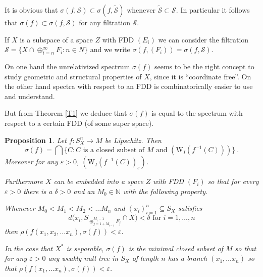 \documentclass[11pt,leqno]{amsart}
\newtheorem{prop}[thm]{Proposition}
\theoremstyle{definition}
\newcommand{\vp}{\varepsilon}
\newcommand{\cS}{\mathcal{S}}
\newcommand{\N}{\mathbb{N}}
\begin{document}
It is obvious that $\sigma(f,\cS)\subset \sigma(f,\tilde{\cS})$ 
whenever $\tilde{\cS}\subset\cS$. In particular
it follows that $\sigma(f)\subset\sigma(f,\cS)$ for any filtration $\cS$.
  
If $X$ is a subspace of a space $Z$ with  FDD $(E_i)$ 
we can consider the filtration
$\cS=\{X\cap\oplus_{i=n}^\infty F_i:n\in N\}$ and 
we write $\sigma(f,(F_i))=\sigma(f,\cS)$.
  
On one hand the unrelativized spectrum $\sigma(f)$ seems to be 
the right concept to study
geometric  and structural properties of $X$, since it is ``coordinate free''. 
On the other hand spectra with respect to an FDD is 
combinatorically easier to use and understand.  

But from Theorem \ref{T1} we deduce that $\sigma(f)$ is equal to the spectrum 
with respect to a  certain FDD (of some super space).
 
\begin{prop}\label{P3}
Let $f: S^n_X\to M$ be Lipschitz. 
Then 
\begin{equation}\label{E41}
\sigma(f)=\bigcap\{ C: C\text{ is a closed subset 
of $M$ and } (\text{W}_{I}(f^{-1}(C))) \}\ .
\end{equation}
Moreover for any $\vp>0$, $(\text{W}_{I}(f^{-1}(C))_\vp)$. 
 
Furthermore $X$ can be embedded into a space $Z$ with FDD $(F_i)$ so that for 
every $\vp>0$ there is a $\delta>0$ and an $M_0\in\N$ with the following
property.
 
Whenever  $M_0<M_1<M_2<\ldots M_n$ and  
$(x_i)_{i=1}^n \subseteq S_X$ satisfies 
$$d\Big(x_i, S_{\oplus_{j=1+M_{i-1}}^{M_i-1} F_j}\cap X \Big)
<\delta \text{ for }i=1,\ldots ,n$$
then $\rho(f(x_1,x_2,\ldots x_n),\sigma(f))<\vp$.
 
In the case that $X^*$ is separable, $\sigma(f)$ is the minimal closed 
subset of $M$ so that for any $\vp>0$ any weakly null tree in $S_X$ 
of length $n$ has a branch $(x_1,\ldots x_n)$
so that $\rho(f(x_1,\ldots x_n),\sigma (f))<\vp$.
\end{prop}
 
\end{document}
